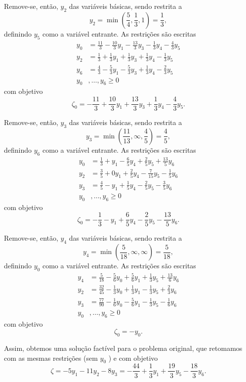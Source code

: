 \documentclass[a4paper]{report}
\begin{document}
Remove-se, então, $y_2$ das variáveis básicas, sendo restrita a \[
y_2 = \min\left( \frac{5}{4}, \frac{1}{3}, 1 \right) = \frac{1}{3}
,\] 
definindo $y_5$ como a variável entrante.
As restrições são escritas
\begin{align*}
    y_0 &= \frac{11}{3}  -\frac{10}{3}y_1 - \frac{13}{3}y_3 -\frac{1}{3}y_4 - \frac{4}{3}y_5 \\
    y_2 &= \frac{1}{3} +\frac{1}{3}y_1 +\frac{1}{3}y_3  +\frac{1}{3}y_4 -\frac{1}{3}y_5 \\
    y_6 &= \frac{4}{3} -\frac{5}{3}y_1 -\frac{5}{3}y_3 +\frac{1}{3}y_4 - \frac{2}{3}y_5 \\
    y_0&,\ldots,y_6 \ge 0
\end{align*}
com objetivo \[
    \zeta_0 = -\frac{11}{3}  +\frac{10}{3}y_1 +\frac{13}{3}y_3 +\frac{1}{3}y_4 -\frac{4}{3}y_5
.\] 

Remove-se, então, $y_3$ das variáveis básicas, sendo restrita a \[
y_3 = \min\left( \frac{11}{13}, \infty, \frac{4}{5} \right) = \frac{4}{5}
,\] 
definindo $y_6$ como a variável entrante.
As restrições são escritas
\begin{align*}
    y_0 &= \frac{1}{3}  +y_1 - \frac{6}{5}y_4 + \frac{2}{5}y_5 + \frac{13}{5}y_6 \\
    y_2 &= \frac{3}{5} + 0y_1 + \frac{2}{5}y_4 - \frac{7}{15}y_5 - \frac{1}{5}y_6 \\
    y_3 &= \frac{4}{5} -y_1 +\frac{1}{5}y_4 - \frac{2}{5}y_5 -\frac{3}{5}y_6 \\
    y_0&,\ldots,y_6 \ge 0
\end{align*}
com objetivo \[
    \zeta_0 = -\frac{1}{3}  -y_1 + \frac{6}{5}y_4 - \frac{2}{5}y_5 - \frac{13}{5}y_6.\] 

Remove-se, então, $y_4$ das variáveis básicas, sendo restrita a \[
y_4 = \min\left( \frac{5}{18}, \infty,\infty \right) = \frac{5}{18}
,\] 
definindo $y_0$ como a variável entrante.
As restrições são escritas
\begin{align*}
    y_4 &= \frac{5}{18} -\frac{5}{6}y_0	+\frac{5}{6}y_1 + \frac{1}{3}y_5 + \frac{13}{6}y_6 \\
    y_2 &= \frac{32}{45} -\frac{1}{3}y_0 + \frac{1}{3}y_1 - \frac{1}{3}y_5 + \frac{2}{3}y_6 \\
    y_3 &= \frac{77}{90} -\frac{1}{6}y_0 -\frac{5}{6}y_1 - \frac{1}{3}y_5 -\frac{1}{6}y_6 \\
    y_0&,\ldots,y_6 \ge 0
\end{align*}
com objetivo \[
    \zeta_0 = -y_0.\] 

Assim, obtemos uma solução factível para o problema original, que retomamos com as mesmas restrições (sem $y_0$ ) e com objetivo \[
    \zeta = -5y_1 -11y_2 -8y_3 = -\frac{44}{3} +\frac{1}{3}y_1 + \frac{19}{3}y_5 -\frac{18}{3}y_6.\] 
\end{document}
